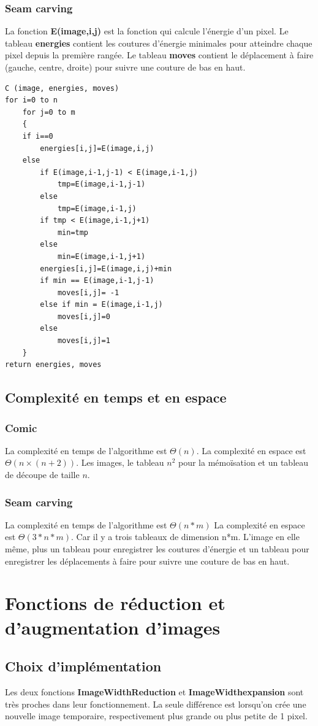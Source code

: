 \documentclass[10pt]{article}
\begin{document}
\subsubsection{Seam carving}
La fonction\textbf{ E(image,i,j)} est la fonction qui calcule l'énergie d'un pixel. Le tableau \textbf{energies} contient les coutures d'énergie minimales pour atteindre chaque pixel depuis la première rangée. Le tableau \textbf{moves} contient le déplacement à faire (gauche, centre, droite) pour suivre une couture de bas en haut. 
\begin{lstlisting}[frame=single]
C (image, energies, moves)
for i=0 to n
	for j=0 to m
	{
	if i==0
		energies[i,j]=E(image,i,j)
	else
		if E(image,i-1,j-1) < E(image,i-1,j)
			tmp=E(image,i-1,j-1)
		else
			tmp=E(image,i-1,j)
		if tmp < E(image,i-1,j+1)
			min=tmp
		else
			min=E(image,i-1,j+1)
		energies[i,j]=E(image,i,j)+min
		if min == E(image,i-1,j-1)			
			moves[i,j]= -1
		else if min = E(image,i-1,j)
			moves[i,j]=0
		else
			moves[i,j]=1
	}
return energies, moves
\end{lstlisting}

\subsection{Complexité en temps et en espace}
\subsubsection{Comic}
La complexité en temps de l'algorithme est $\Theta(n)$.
La complexité en espace est $\Theta(n \times (n+2))$. Les images, le tableau $n^2$ pour la mémoïsation et un tableau de découpe de taille $n$.
\subsubsection{Seam carving}
La complexité en temps de l'algorithme est $\Theta(n*m)$
La complexité en espace est $\Theta(3*n*m)$. Car il y a trois tableaux de dimension n*m. L'image en elle même, plus un tableau pour enregistrer les coutures d'énergie et un tableau pour enregistrer les déplacements à faire pour suivre une couture de bas en haut.

\section{Fonctions de réduction et d'augmentation d'images}
\subsection{Choix d'implémentation}
Les deux fonctions \textbf{ImageWidthReduction} et \textbf{ImageWidthexpansion} sont très proches dans leur fonctionnement. La seule différence est lorsqu'on crée une nouvelle image temporaire, respectivement plus grande ou plus petite de 1 pixel.
\end{document}
